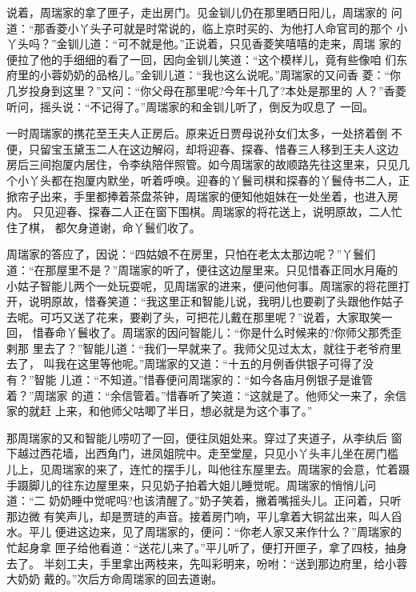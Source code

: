 说着，周瑞家的拿了匣子，走出房门。见金钏儿仍在那里晒日阳儿，周瑞家的
问道：“那香菱小丫头子可就是时常说的，临上京时买的、为他打人命官司的那个
小丫头吗？”金钏儿道：“可不就是他。”正说着，只见香菱笑嘻嘻的走来，周瑞
家的便拉了他的手细细的看了一回，因向金钏儿笑道：“这个模样儿，竟有些像咱
们东府里的小蓉奶奶的品格儿。”金钏儿道：“我也这么说呢。”周瑞家的又问香
菱：“你几岁投身到这里？”又问：“你父母在那里呢?今年十几了?本处是那里的
人？”香菱听问，摇头说：“不记得了。”周瑞家的和金钏儿听了，倒反为叹息了
一回。

一时周瑞家的携花至王夫人正房后。原来近日贾母说孙女们太多，一处挤着倒
不便，只留宝玉黛玉二人在这边解闷，却将迎春、探春、惜春三人移到王夫人这边
房后三间抱厦内居住，令李纨陪伴照管。如今周瑞家的故顺路先往这里来，只见几
个小丫头都在抱厦内默坐，听着呼唤。迎春的丫鬟司棋和探春的丫鬟侍书二人，正
掀帘子出来，手里都捧着茶盘茶钟，周瑞家的便知他姐妹在一处坐着，也进入房内。
只见迎春、探春二人正在窗下围棋。周瑞家的将花送上，说明原故，二人忙住了棋，
都欠身道谢，命丫鬟们收了。

周瑞家的答应了，因说：“四姑娘不在房里，只怕在老太太那边呢？”丫鬟们
道：“在那屋里不是？”周瑞家的听了，便往这边屋里来。只见惜春正同水月庵的
小姑子智能儿两个一处玩耍呢，见周瑞家的进来，便问他何事。周瑞家的将花匣打
开，说明原故，惜春笑道：“我这里正和智能儿说，我明儿也要剃了头跟他作姑子
去呢。可巧又送了花来，要剃了头，可把花儿戴在那里呢？”说着，大家取笑一回，
惜春命丫鬟收了。周瑞家的因问智能儿：“你是什么时候来的?你师父那秃歪剌那
里去了？”智能儿道：“我们一早就来了。我师父见过太太，就往于老爷府里去了，
叫我在这里等他呢。”周瑞家的又道：“十五的月例香供银子可得了没有？”智能
儿道：“不知道。”惜春便问周瑞家的：“如今各庙月例银子是谁管着？”周瑞家
的道：“余信管着。”惜春听了笑道：“这就是了。他师父一来了，余信家的就赶
上来，和他师父咕唧了半日，想必就是为这个事了。”

那周瑞家的又和智能儿唠叨了一回，便往凤姐处来。穿过了夹道子，从李纨后
窗下越过西花墙，出西角门，进凤姐院中。走至堂屋，只见小丫头丰儿坐在房门槛
儿上，见周瑞家的来了，连忙的摆手儿，叫他往东屋里去。周瑞家的会意，忙着蹑
手蹑脚儿的往东边屋里来，只见奶子拍着大姐儿睡觉呢。周瑞家的悄悄儿问道：“二
奶奶睡中觉呢吗?也该清醒了。”奶子笑着，撇着嘴摇头儿。正问着，只听那边微
有笑声儿，却是贾琏的声音。接着房门响，平儿拿着大铜盆出来，叫人舀水。平儿
便进这边来，见了周瑞家的，便问：“你老人家又来作什么？”周瑞家的忙起身拿
匣子给他看道：“送花儿来了。”平儿听了，便打开匣子，拿了四枝，抽身去了。
半刻工夫，手里拿出两枝来，先叫彩明来，吩咐：“送到那边府里，给小蓉大奶奶
戴的。”次后方命周瑞家的回去道谢。

